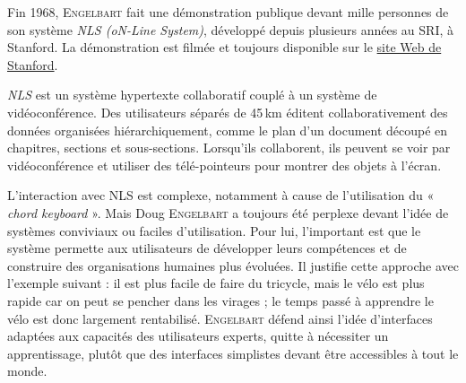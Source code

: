 Fin 1968, \textsc{Engelbart} fait une démonstration publique devant mille personnes de son système \textit{NLS (oN-Line System)}, développé depuis plusieurs années au SRI, à Stanford. La démonstration est filmée et toujours disponible sur le \href{https://web.stanford.edu/dept/SUL/library/extra4/sloan/MouseSite/1968Demo.html}{site Web de Stanford}.

\textit{NLS} est un système hypertexte collaboratif couplé à un système de vidéoconférence. Des utilisateurs séparés de 45\,km éditent collaborativement des données organisées hiérarchiquement, comme le plan d'un document découpé en chapitres, sections et sous-sections. Lorsqu'ils collaborent, ils peuvent se voir par vidéoconférence et utiliser des télé-pointeurs pour montrer des objets à l'écran.

L'interaction avec NLS est complexe, notamment à cause de l'utilisation du « \textit{chord keyboard} ». Mais Doug \textsc{Engelbart} a toujours été perplexe devant l'idée de systèmes conviviaux ou faciles d'utilisation. Pour lui, l'important est que le système permette aux utilisateurs de développer leurs compétences et de construire des organisations humaines plus évoluées. Il justifie cette approche avec l'exemple suivant : il est plus facile de faire du tricycle, mais le vélo est plus rapide car on peut se pencher dans les virages ; le temps passé à apprendre le vélo est donc largement rentabilisé. \textsc{Engelbart} défend ainsi l'idée d'interfaces adaptées aux capacités des utilisateurs experts, quitte à nécessiter un apprentissage, plutôt que des interfaces simplistes devant être accessibles à tout le monde.

